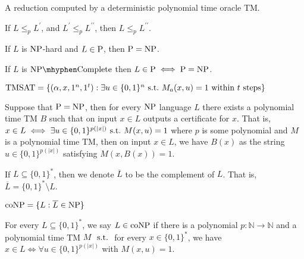 \begin{note}
  A reduction computed by a deterministic polynomial time oracle TM.
\end{note}

\begin{note}[Transitivity]
  If $L \leq_p L^\prime$, and $L^\prime \leq_p L^{\prime \prime}$, then
  $L \leq_p L^{\prime \prime}$.
\end{note}

\begin{note}
  If $L$ is $\mathrm{NP}$-hard and $L \in \mathrm{P}$, then $\mathrm{P} = \mathrm{NP}$.
\end{note}

\begin{note}
  If $L$ is $\NPC$ then $L \in \mathrm{P} \iff \mathrm{P} = \mathrm{NP}$.
\end{note}

\begin{note}[TMSAT]
  $\mathrm{TMSAT} = \{ (\alpha, x, 1^n, 1^t) :
    \text{$\exists u \in \{0, 1\}^n \mathrm{\ s.t.\ }
          M_a (x, u) = 1$ within $t$ steps} \}$
\end{note}

\begin{note}
  Suppose that $\mathrm{P} = \mathrm{NP}$, then for every $\mathrm{NP}$ language $L$ there exists
  a polynomial time TM $B$ such that on input $x \in L$ outputs a certificate
  for $x$.
  That is, $x \in L \iff \exists u \in \{ 0, 1\}^{p(|x|)} \mathrm{\ s.t.\ } M(x, u) = 1$
  where $p$ is some polynomial and $M$ is a polynomial time TM, then on
  input $x \in L$, we have $B(x)$ as the string $u \in \{0, 1\}^{p(|x|)}$
  satisfying $M(x, B(x)) = 1$.
\end{note}

\begin{note}
  If $L \subseteq \{0, 1\}^\ast$, then we denote $\overline{L}$ to be the
  complement of $L$.
  That is, $\overline{L} = \{0, 1\}^\ast \setminus L$.
\end{note}

\begin{note}[$\coNP$]
  $\mathrm{coNP} = \{L : \overline{L} \in \mathrm{NP}\}$
\end{note}

\begin{note}
  For every $L \subseteq \{0, 1\}^\ast$, we say $L \in \mathrm{coNP}$ if there
  is a polynomial $p : \mathbb{N} \to \mathbb{N}$ and a polynomial time
  TM $M$ $\mathrm{\ s.t.\ }$ for every $x \in \{0, 1\}^\ast$, we have
  $x \in L \iff \forall u \in \{0, 1\}^{p(|x|)}$ with $M(x, u) = 1$.
\end{note}

